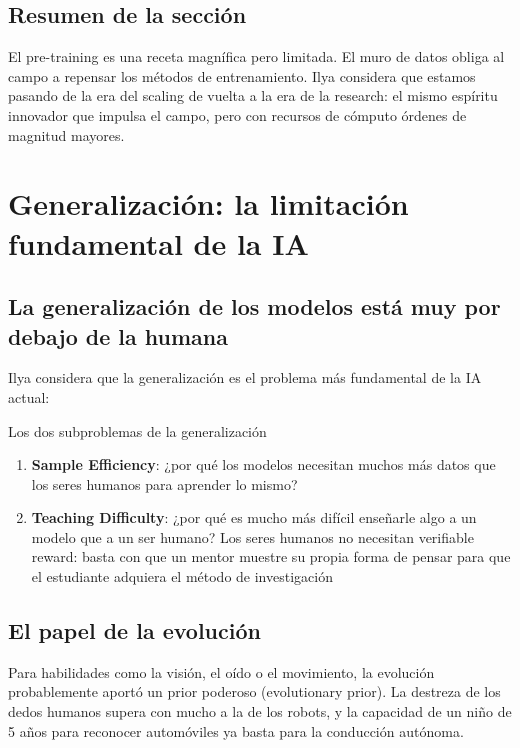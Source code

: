 \documentclass[a4paper]{article}
\begin{document}
\subsection{Resumen de la sección}

El pre-training es una receta magnífica pero limitada. El muro de datos obliga al campo a repensar los métodos de entrenamiento. Ilya considera que estamos pasando de la era del scaling de vuelta a la era de la research: el mismo espíritu innovador que impulsa el campo, pero con recursos de cómputo órdenes de magnitud mayores.
\section{Generalización: la limitación fundamental de la IA}

\subsection{La generalización de los modelos está muy por debajo de la humana}

Ilya considera que la generalización es el problema más fundamental de la IA actual:

\begin{importantbox}{Los dos subproblemas de la generalización}
\begin{enumerate}
    \item \textbf{Sample Efficiency}: ¿por qué los modelos necesitan muchos más datos que los seres humanos para aprender lo mismo?
    \item \textbf{Teaching Difficulty}: ¿por qué es mucho más difícil enseñarle algo a un modelo que a un ser humano? Los seres humanos no necesitan verifiable reward: basta con que un mentor muestre su propia forma de pensar para que el estudiante adquiera el método de investigación
\end{enumerate}
\end{importantbox}

\subsection{El papel de la evolución}

Para habilidades como la visión, el oído o el movimiento, la evolución probablemente aportó un prior poderoso (evolutionary prior). La destreza de los dedos humanos supera con mucho a la de los robots, y la capacidad de un niño de 5 años para reconocer automóviles ya basta para la conducción autónoma.
\end{document}
